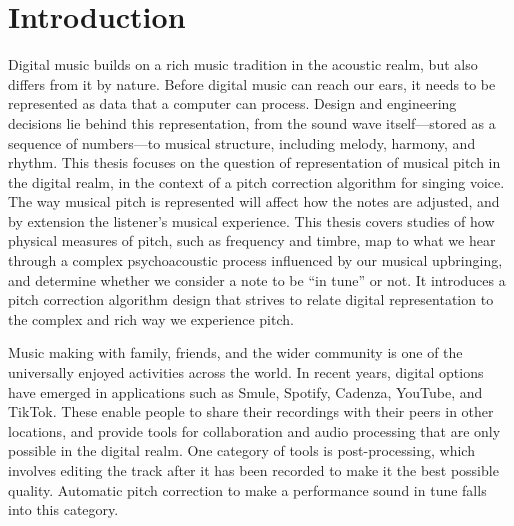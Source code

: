 \chapter{Introduction}
\label{chap:thesis-intro}
Digital music builds on a rich music tradition in the acoustic realm, but also differs from it by nature. Before digital music can reach our ears, it needs to be represented as data that a computer can process. Design and engineering decisions lie behind this representation, from the sound wave itself---stored as a sequence of numbers---to musical structure, including melody, harmony, and rhythm. This thesis focuses on the question of representation of musical pitch in the digital realm, in the context of a pitch correction algorithm for singing voice. The way musical pitch is represented will affect how the notes are adjusted, and by extension the listener's musical experience. This thesis covers studies of how physical measures of pitch, such as frequency and timbre, map to what we hear through a complex psychoacoustic process influenced by our musical upbringing, and determine whether we consider a note to be ``in tune'' or not. It introduces a pitch correction algorithm design that strives to relate digital representation to the complex and rich way we experience pitch.

Music making with family, friends, and the wider community is one of the universally enjoyed activities across the world. In recent years, digital options have emerged in applications such as Smule, Spotify, Cadenza, YouTube, and TikTok. These enable people to share their recordings with their peers in other locations, and provide tools for collaboration and audio processing that are only possible in the digital realm. One category of tools is post-processing, which involves editing the track after it has been recorded to make it the best possible quality. Automatic pitch correction to make a performance sound in tune falls into this category. 

